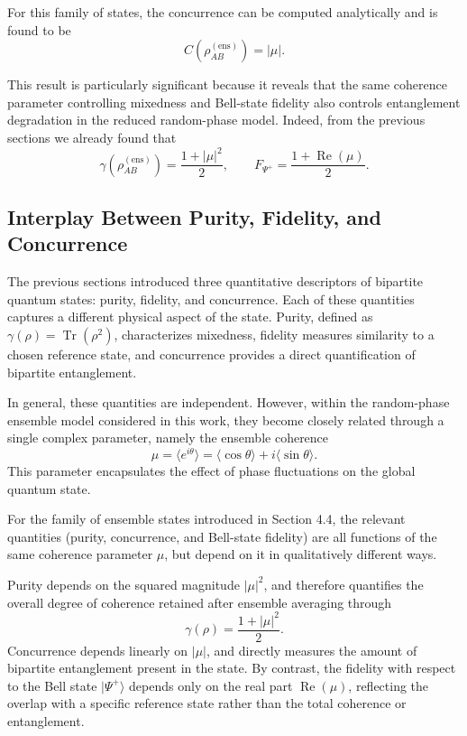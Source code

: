 \documentclass[a4paper]{article}
\begin{document}
For this family of states, the concurrence can be computed analytically and is found to be
\[
C\!\left(\rho_{AB}^{(\mathrm{ens})}\right) = |\mu|.
\]

This result is particularly significant because it reveals that the same coherence parameter controlling mixedness and Bell-state fidelity also controls entanglement degradation in the reduced random-phase model. Indeed, from the previous sections we already found that
\[
\gamma\!\left(\rho_{AB}^{(\mathrm{ens})}\right)
=
\frac{1+|\mu|^2}{2},
\qquad
F_{\Psi^+}
=
\frac{1+\operatorname{Re}(\mu)}{2}.
\]

\subsection{Interplay Between Purity, Fidelity, and Concurrence}

The previous sections introduced three quantitative descriptors of bipartite quantum states: purity, fidelity, and concurrence. Each of these quantities captures a different physical aspect of the state. Purity, defined as \(\gamma(\rho)=\operatorname{Tr}(\rho^2)\), characterizes mixedness, fidelity measures similarity to a chosen reference state, and concurrence provides a direct quantification of bipartite entanglement.

In general, these quantities are independent. However, within the random-phase ensemble model considered in this work, they become closely related through a single complex parameter, namely the ensemble coherence
\[
\mu = \langle e^{i\theta} \rangle
=
\langle \cos\theta \rangle + i \langle \sin\theta \rangle.
\]
This parameter encapsulates the effect of phase fluctuations on the global quantum state.

\medskip

For the family of ensemble states introduced in Section 4.4, the relevant quantities
(purity, concurrence, and Bell-state fidelity) are all functions of the same coherence
parameter \(\mu\), but depend on it in qualitatively different ways.

\medskip

Purity depends on the squared magnitude \( |\mu|^2 \), and therefore quantifies the overall degree of coherence retained after ensemble averaging through
\[
\gamma(\rho) = \frac{1 + |\mu|^2}{2}.
\]
Concurrence depends linearly on \( |\mu| \), and directly measures the amount of bipartite entanglement present in the state. By contrast, the fidelity with respect to the Bell state \( |\Psi^+\rangle \) depends only on the real part \( \operatorname{Re}(\mu) \), reflecting the overlap with a specific reference state rather than the total coherence or entanglement.
\end{document}
